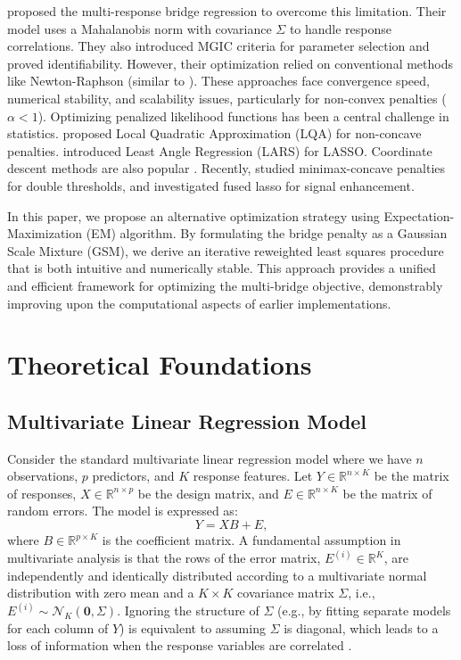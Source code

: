 \documentclass[twoside]{article}
\begin{document}
\cite{ghatari2024} proposed the multi-response bridge regression to overcome this limitation. Their model uses a Mahalanobis norm with covariance \(\Sigma\) to handle response correlations. They also introduced MGIC criteria for parameter selection and proved identifiability. However, their optimization relied on conventional methods like Newton-Raphson (similar to \cite{fan2001}). These approaches face convergence speed, numerical stability, and scalability issues, particularly for non-convex penalties (\(\alpha < 1\)).
Optimizing penalized likelihood functions has been a central challenge in statistics. \cite{fan2001} proposed Local Quadratic Approximation (LQA) for non-concave penalties. \cite{efron2004} introduced Least Angle Regression (LARS) for LASSO. Coordinate descent methods are also popular \cite{tibshirani1996}. Recently, \cite{kittisuwan2022} studied minimax-concave penalties for double thresholds, and \cite{kittisuwan2023} investigated fused lasso for signal enhancement.



 In this paper, we propose an alternative optimization strategy using Expectation-Maximization (EM) algorithm. By formulating the bridge penalty as a Gaussian Scale Mixture (GSM), we derive an iterative reweighted least squares procedure that is both intuitive and numerically stable. This approach provides a unified and efficient framework for optimizing the multi-bridge objective, demonstrably improving upon the computational aspects of earlier implementations.



\section{Theoretical Foundations}



\subsection{Multivariate Linear Regression Model}
Consider the standard multivariate linear regression model where we have \(n\) observations, \(p\) predictors, and \(K\) response features. Let \(Y \in \mathbb{R}^{n \times K}\) be the matrix of responses, \(X \in \mathbb{R}^{n \times p}\) be the design matrix, and \(E \in \mathbb{R}^{n \times K}\) be the matrix of random errors. The model is expressed as:
\begin{equation}\label{eq:obj1}
Y = X B + E,
\end{equation}
where \(B \in \mathbb{R}^{p \times K}\) is the coefficient matrix. A fundamental assumption in multivariate analysis is that the rows of the error matrix, \(E^{(i)} \in \mathbb{R}^K\), are independently and identically distributed according to a multivariate normal distribution with zero mean and a \(K \times K\) covariance matrix \(\Sigma\), i.e., \(E^{(i)} \sim \mathcal{N}_K(\mathbf{0}, \Sigma)\). Ignoring the structure of \(\Sigma\) (e.g., by fitting separate models for each column of \(Y\)) is equivalent to assuming \(\Sigma\) is diagonal, which leads to a loss of information when the response variables are correlated \cite{ghatari2024}.
\end{document}
